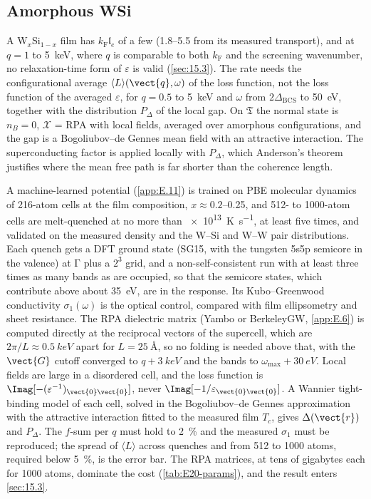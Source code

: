 \subsection{Amorphous WSi}

A W$_x$Si$_{1-x}$ film has $k_{\mathrm{F}}\mathfrak{l}_e$ of a few (1.8--5.5 from its measured transport), and at $q = 1$ to \SI{5}{keV}, where $q$ is comparable to both $k_{\mathrm{F}}$ and the screening wavenumber, no relaxation-time form of $\varepsilon$ is valid (\cref{sec:15.3}). The rate needs the configurational average $\langle L\rangle(\vect{q},\omega)$ of the loss function, not the loss function of the averaged $\varepsilon$, for $q = 0.5$ to \SI{5}{keV} and $\omega$ from $2\Delta_{\mathrm{BCS}}$ to \SI{50}{eV}, together with the distribution $P_\Delta$ of the local gap. On $\mathfrak{T}$ the normal state is $n_B = 0$, $\mathcal{X}$ = RPA with local fields, averaged over amorphous configurations, and the gap is a Bogoliubov--de Gennes mean field with an attractive interaction. The superconducting factor is applied locally with $P_\Delta$, which Anderson's theorem justifies where the mean free path is far shorter than the coherence length.

A machine-learned potential (\cref{app:E.11}) is trained on PBE molecular dynamics of 216-atom cells at the film composition, $x \approx 0.2$--0.25, and 512- to 1000-atom cells are melt-quenched at no more than \SI{e13}{K.s^{-1}}, at least five times, and validated on the measured density and the W--Si and W--W pair distributions. Each quench gets a DFT ground state (SG15, with the tungsten 5s5p semicore in the valence) at $\mathrm{\Gamma}$ plus a $2^3$ grid, and a non-self-consistent run with at least three times as many bands as are occupied, so that the semicore states, which contribute above about \SI{35}{eV}, are in the response. Its Kubo--Greenwood conductivity $\sigma_1(\omega)$ is the optical control, compared with film ellipsometry and sheet resistance. The RPA dielectric matrix (Yambo or BerkeleyGW, \cref{app:E.6}) is computed directly at the reciprocal vectors of the supercell, which are $2\pi/L \approx \SI{0.5}{keV}$ apart for $L = \SI{25}{\angstrom}$, so no folding is needed above that, with the $\vect{G}$ cutoff converged to $q + \SI{3}{keV}$ and the bands to $\omega_{\mathrm{max}} + \SI{30}{eV}$. Local fields are large in a disordered cell, and the loss function is $\Imag[-(\varepsilon^{-1})_{\vect{0}\vect{0}}]$, never $\Imag[-1/\varepsilon_{\vect{0}\vect{0}}]$. A Wannier tight-binding model of each cell, solved in the Bogoliubov--de Gennes approximation with the attractive interaction fitted to the measured film $T_c$, gives $\Delta(\vect{r})$ and $P_\Delta$. The $f$-sum per $q$ must hold to \SI{2}{\percent} and the measured $\sigma_1$ must be reproduced; the spread of $\langle L\rangle$ across quenches and from 512 to 1000 atoms, required below \SI{5}{\percent}, is the error bar. The RPA matrices, at tens of gigabytes each for 1000 atoms, dominate the cost (\cref{tab:E20-params}), and the result enters \cref{sec:15.3}.

